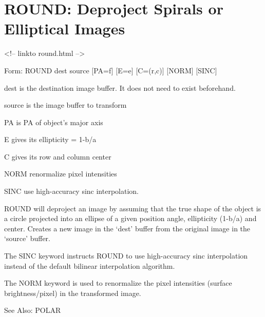\section{ROUND: Deproject Spirals or Elliptical Images}
\begin{rawhtml}
<!-- linkto round.html -->
\end{rawhtml}
\begin{command}
  \item[Form: ROUND dest source {[PA=f]} {[E=e]} {[C=(r,c)]} {[NORM]} 
       {[SINC]}\hfill]{}
  \item[dest]{is the destination image buffer. It does not need
       to exist beforehand.}
  \item[source]{is the image buffer to transform}
  \item[PA]{is PA of object's major axis}
  \item[E]{gives its ellipticity = 1-b/a}
  \item[C]{gives its row and column center}
  \item[NORM]{renormalize pixel intensities}
  \item[SINC]{use high-accuracy sinc interpolation.}
\end{command}

ROUND will deproject an image by assuming that the true shape of the object
is a circle projected into an ellipse of a given position angle,
ellipticity (1-b/a) and center.  Creates a new image in the `dest' buffer
from the original image in the `source' buffer.

The SINC keyword instructs ROUND to use high-accuracy sinc interpolation
instead of the default bilinear interpolation algorithm.  

The NORM keyword is used to renormalize the pixel intensities (surface
brightness/pixel) in the transformed image.

See Also: POLAR


